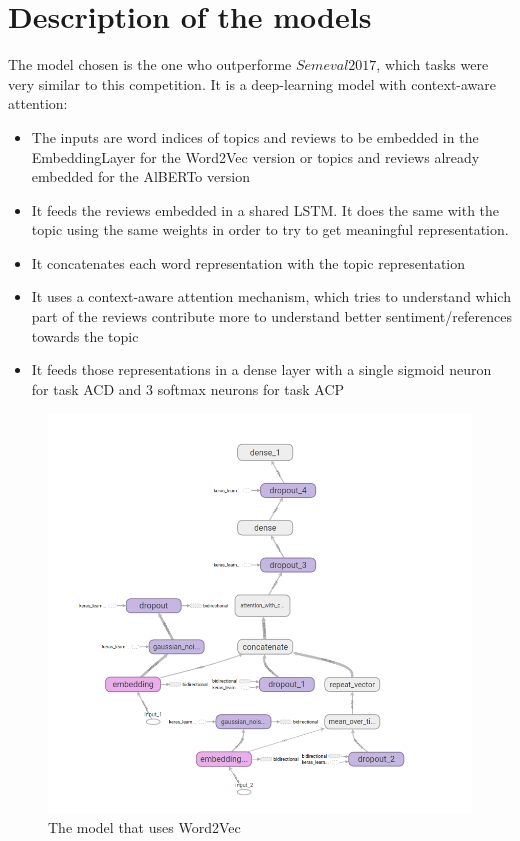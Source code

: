 \documentclass{article}
\begin{document}
    \section{Description of the models}\label{sec:s3}
        The model chosen is the one who outperforme $Semeval2017$, which tasks were very similar to this competition.
        It is a deep-learning model with context-aware attention:
        \begin{itemize}
            \item The inputs are word indices of topics and reviews to be embedded in the EmbeddingLayer for the Word2Vec version or topics and reviews already embedded for the AlBERTo version
            \item It feeds the reviews embedded in a shared LSTM. It does the same with the topic using the same weights in order to try to get meaningful representation.
            \item It concatenates each word representation with the topic representation
            \item It uses a context-aware attention mechanism, which tries to understand which part of the reviews contribute more to understand better sentiment/references towards the topic
            \item It feeds those representations in a dense layer with a single sigmoid neuron for task ACD and 3 softmax neurons for task ACP
        \end{itemize}
        \begin{figure}
            \includegraphics[width=\linewidth]{w2v_model.png}
            \caption{The model that uses Word2Vec}
            \label{fig:w2v_model}
        \end{figure}
\end{document}
